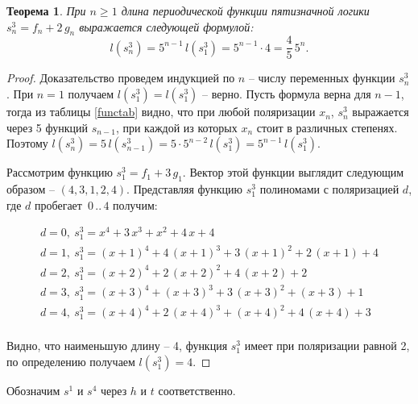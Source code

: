 \documentclass[a4paper, 12pt]{article}
\newtheorem{myth}{Теорема}
\begin{document}
\begin{myth}
При $n \geqslant 1$ длина периодической функции пятизначной логики $s^3_n = f_n + 2\,g_n$ выражается следующей формулой:
$$ l(s^3_n) = 5^{n-1}\,l(s^3_1) = 5^{n-1} \cdot 4 = \frac{4}{5}\,5^n.$$
\end{myth}
\begin{proof}
Доказательство проведем индукцией по $n$ -- числу переменных функции $s^3_n$.
При $n = 1$ получаем $l(s^3_1) = l(s^3_1)$ -- верно.
Пусть формула верна для $n-1$, тогда из таблицы \ref{functab} видно, что при любой поляризации $x_n$, $s^3_n$ выражается
через 5 функций $s_{n-1}$, при каждой из которых $x_n$ стоит в различных степенях.
Поэтому $l(s^3_n) = 5\,l(s^3_{n-1}) = 5\cdot5^{n-2}\,l(s^3_1) = 5^{n-1}\,l(s^3_1)$.

Рассмотрим функцию $s^3_1 = f_1 + 3\,g_1$. Вектор этой функции выглядит следующим образом -- $(4,3,1,2,4)$.
Представляя функцию $s^3_1$ полиномами с поляризацией $d$, где $d$ пробегает~$0\,..\,4$ получим:

$$
\begin{array}{l}
d = 0, \ s^3_1 = x^4 + 3\,x^3 + x^2 + 4\,x + 4 \\

d = 1, \ s^3_1 = (x+1)^4 + 4\,(x+1)^3 + 3\,(x+1)^2 + 2\,(x+1) + 4 \\

d = 2, \ s^3_1 = (x+2)^4 + 2\,(x+2)^2 + 4\,(x+2) + 2 \\

d = 3, \ s^3_1 = (x+3)^4 + (x+3)^3 + 3\,(x+3)^2 + (x+3) + 1 \\

d = 4, \ s^3_1 = (x+4)^4 + 2\,(x+4)^3 + (x+4)^2 + 4\,(x+4) + 3 \\
\end{array}
$$

Видно, что наименьшую длину -- 4, функция $s^3_1$ имеет при поляризации равной 2, по определению получаем  $l(s^3_1) = 4$.
\end{proof}

\newpage

Обозначим $s^1$ и $s^4$ через $h$ и $t$ соответственно.
\end{document}
